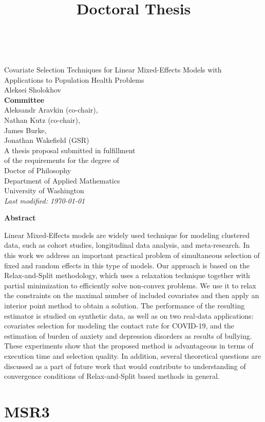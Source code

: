 \documentclass[12pt,a4paper]{book}
\newcommand{\userName}{Aleksei Sholokhov}
\newcommand{\department}{Department of Applied Mathematics}
\newcommand{\institution}{University of Washington}
\newcommand{\doctitle}{Doctoral Thesis}
\numberwithin{equation}{section} %
\numberwithin{figure}{section} %
\numberwithin{table}{section} %
\begin{document}
\title{\doctitle}
~\\
{\center
{\large 
{\huge
Covariate Selection Techniques for Linear Mixed-Effects Models with Applications to Population Health Problems }
\\[10mm]
\userName
\\[40mm]
{\center
\textbf{Committee}\\
Aleksandr Aravkin (co-chair),\\
Nathan Kutz (co-chair), \\
James Burke, \\
Jonathan Wakefield (GSR)
}
\\[40mm]
{A thesis proposal submitted in fulfillment\\ of the requirements for the degree of}
\\[5mm]
{Doctor of Philosophy}
\\[15mm]
\department
\\[5mm]
\institution
}
\\[10mm]
\textit{Last modified: \today}

}  

\newpage
{\center \textbf{Abstract}\\[5mm]}

Linear Mixed-Effects models are widely used technique for modeling clustered data, such as cohort studies, longitudinal data analysis, and meta-research. In this work we address an important practical problem of simultaneous selection of fixed and random effects in this type of models. Our approach is based on the Relax-and-Split methodology, which uses a relaxation technique together with partial minimization to efficiently solve non-convex problems. We use it to relax the constraints on the maximal number of included covariates and then apply an interior point method to obtain a solution. The performance of the resulting estimator is studied on synthetic data, as well as on two real-data applications: covariates selection for modeling the contact rate for COVID-19, and the estimation of burden of anxiety and depression disorders as results of bullying. These experiments show that the proposed method is advantageous in terms of execution time and selection quality. In addition, several theoretical questions are discussed as a part of future work that would contribute to understanding of convergence conditions of Relax-and-Split based methods in general.


\newpage
\tableofcontents

\listoftodos

\chapter{MSR3}

\end{document}
